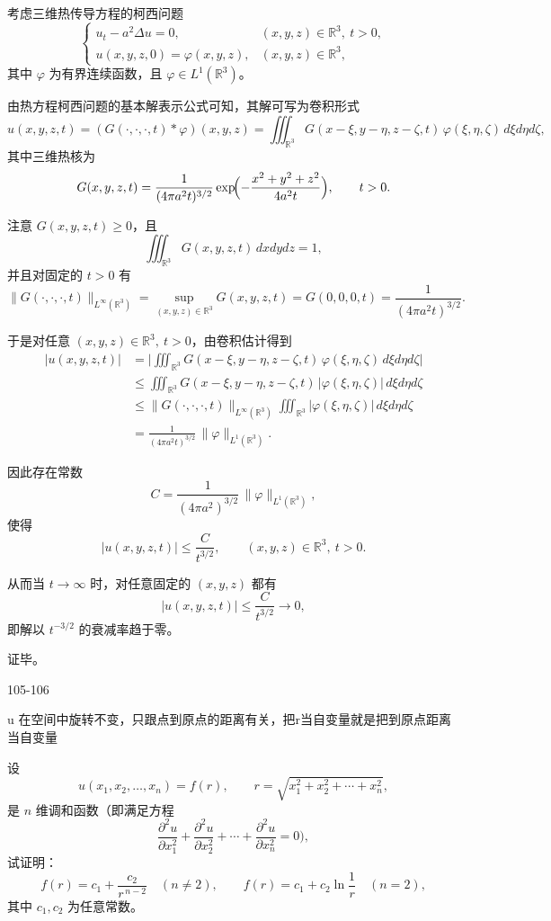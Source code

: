 \begin{solution}
考虑三维热传导方程的柯西问题
\[
\begin{cases}
u_t-a^2\Delta u=0, & (x,y,z)\in\mathbb R^3,\ t>0,\\[0.3em]
u(x,y,z,0)=\varphi(x,y,z), & (x,y,z)\in\mathbb R^3,
\end{cases}
\]
其中 $\varphi$ 为有界连续函数，且 $\varphi\in L^1(\mathbb R^3)$。

由热方程柯西问题的基本解表示公式可知，其解可写为卷积形式
\[
u(x,y,z,t)
=(G(\cdot,\cdot,\cdot,t)*\varphi)(x,y,z)
=\iiint_{\mathbb R^3}
  G(x-\xi,y-\eta,z-\zeta,t)\,\varphi(\xi,\eta,\zeta)\,
d\xi d\eta d\zeta,
\]
其中三维热核为
\[
G(x,y,z,t)
=\frac1{(4\pi a^2 t)^{3/2}}
  \exp\!\Bigl(-\frac{x^2+y^2+z^2}{4a^2 t}\Bigr),
\qquad t>0.
\]

注意 $G(x,y,z,t)\ge0$，且
\[
\iiint_{\mathbb R^3} G(x,y,z,t)\,dxdydz=1,
\]
并且对固定的 $t>0$ 有
\[
\|G(\cdot,\cdot,\cdot,t)\|_{L^\infty(\mathbb R^3)}
=\sup_{(x,y,z)\in\mathbb R^3} G(x,y,z,t)
=G(0,0,0,t)
=\frac1{(4\pi a^2 t)^{3/2}}.
\]

于是对任意 $(x,y,z)\in\mathbb R^3,\ t>0$，由卷积估计得到
\[
\begin{aligned}
|u(x,y,z,t)|
&=\biggl|\iiint_{\mathbb R^3}
  G(x-\xi,y-\eta,z-\zeta,t)\,\varphi(\xi,\eta,\zeta)\,
  d\xi d\eta d\zeta\biggr|\\[0.3em]
&\le \iiint_{\mathbb R^3}
   G(x-\xi,y-\eta,z-\zeta,t)\,
   |\varphi(\xi,\eta,\zeta)|\,
   d\xi d\eta d\zeta\\[0.3em]
&\le \|G(\cdot,\cdot,\cdot,t)\|_{L^\infty(\mathbb R^3)}
    \iiint_{\mathbb R^3} |\varphi(\xi,\eta,\zeta)|\,d\xi d\eta d\zeta\\[0.3em]
&= \frac1{(4\pi a^2 t)^{3/2}}\,
    \|\varphi\|_{L^1(\mathbb R^3)}.
\end{aligned}
\]

因此存在常数
\[
C=\frac1{(4\pi a^2)^{3/2}}\,
\|\varphi\|_{L^1(\mathbb R^3)},
\]
使得
\[
|u(x,y,z,t)|\le \frac{C}{t^{3/2}},
\qquad (x,y,z)\in\mathbb R^3,\ t>0.
\]

从而当 $t\to\infty$ 时，对任意固定的 $(x,y,z)$ 都有
\[
|u(x,y,z,t)|\le \frac{C}{t^{3/2}}\longrightarrow 0,
\]
即解以 $t^{-3/2}$ 的衰减率趋于零。

证毕。
\end{solution}
105-106
\begin{dxtips}[径向函数]
   u 在空间中旋转不变，只跟点到原点的距离有关，把r当自变量就是把到原点距离当自变量 
\end{dxtips}
\begin{homework}[1]
设
\[
u(x_1,x_2,\dots,x_n)=f(r),\qquad
r=\sqrt{x_1^2+x_2^2+\cdots+x_n^2},
\]
是 $n$ 维调和函数（即满足方程
\[
\frac{\partial^2 u}{\partial x_1^2}
+\frac{\partial^2 u}{\partial x_2^2}
+\cdots
+\frac{\partial^2 u}{\partial x_n^2}=0),
\]
试证明：
\[
f(r)=c_1+\frac{c_2}{r^{\,n-2}}\quad (n\ne 2),\qquad
f(r)=c_1+c_2\ln\frac1r\quad (n=2),
\]
其中 $c_1,c_2$ 为任意常数。
\end{homework}
